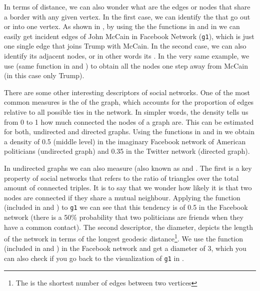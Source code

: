 In terms of distance, we can also wonder what are the edges or nodes that share a border with any given vertex. In the first case, we can identify the  that go out or into one vertex. As shown in , by using the the functions  in  and  in  we can easily get incident edges of John McCain in Facebook Network (\texttt{g1}), which is just one single edge that joins Trump with McCain. In the second case, we can also identify its adjacent nodes, or in other words its . In the very same example, we use  (same function in  and ) to obtain all the nodes one step away from McCain (in this case only Trump).


There are some other interesting descriptors of social networks. One of the most common measures is the  of the graph, which accounts for the proportion of edges relative to all possible ties in the network. In simpler words, the density tells us from 0 to 1 how much connected the nodes of a graph are. This can be estimated for both, undirected and directed graphs. Using the functions  in  and  in  we obtain a density of 0.5 (middle level) in the imaginary Facebook network of American politicians (undirected graph) and 0.35 in the Twitter network (directed graph). 

In undirected graphs we can also measure  (also known as  and . The first is a key property of social networks that refers to the ratio of triangles over the total amount of connected triples. It is to say that we wonder how likely it is that two nodes are connected if they share a mutual neighbour. Applying the function  (included in  and ) to \texttt{g1} we can see that this tendency is of 0.5 in the Facebook network (there is a 50\% probability that two politicians 
are friends when they have a common contact). The second descriptor, the diameter, depicts the length of the network in terms of the longest geodesic distance\footnote{The  is the shortest number of edges between two vertices}. We use the function  (included in  and ) in the Facebook network and get a diameter of 3, which you can also check if you go back to the visualization of \texttt{g1} in . 

